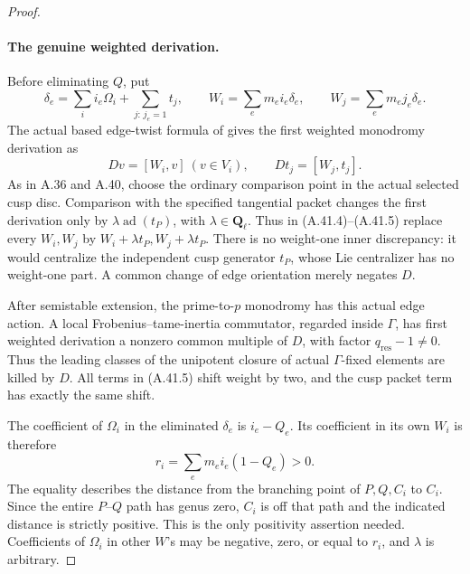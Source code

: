 \begin{proof}
\paragraph{The genuine weighted derivation.}
Before eliminating \(Q\), put
\[
 \delta_e=\sum_i i_e\Omega_i+\sum_{j:\,j_e=1}t_j,
 \qquad W_i=\sum_e m_ei_e\delta_e,
 \qquad W_j=\sum_e m_ej_e\delta_e.                    \tag{A.41.4}
\]
The actual based edge-twist formula of
\cite[Definition 3.1.5 and Theorem 3.1.6]{fghBettsDogra}
gives the first weighted monodromy derivation as
\[
                  Dv=[W_i,v]\ (v\in V_i),
                  \qquad Dt_j=[W_j,t_j].             \tag{A.41.5}
\]
As in A.36 and A.40, choose the ordinary comparison point
in the actual selected cusp disc. Comparison with the
specified tangential packet changes the first derivation
only by \(\lambda\operatorname{ad}(t_P)\), with
\(\lambda\in\mathbf Q_\ell\). Thus in (A.41.4)--(A.41.5)
replace every \(W_i,W_j\) by \(W_i+\lambda t_P,W_j+
\lambda t_P\). There is no weight-one inner discrepancy:
it would centralize the independent cusp generator
\(t_P\), whose Lie centralizer has no weight-one part.
A common change of edge orientation merely negates \(D\).

After semistable extension, the prime-to-\(p\) monodromy
has this actual edge action. A local Frobenius--tame-inertia
commutator, regarded inside \(\Gamma\), has first
weighted derivation a nonzero common multiple of \(D\),
with factor \(q_{\mathrm{res}}-1\ne0\). Thus the
leading classes of the unipotent closure of actual
\(\Gamma\)-fixed elements are killed by \(D\).
All terms in (A.41.5) shift weight by two, and the cusp
packet term has exactly the same shift.

The coefficient of \(\Omega_i\) in the eliminated
\(\delta_e\) is \(i_e-Q_e\). Its coefficient in
its own \(W_i\) is therefore
\[
               r_i=\sum_e m_ei_e(1-Q_e)>0.           \tag{A.41.6}
\]
The equality describes the distance from the branching
point of \(P,Q,C_i\) to \(C_i\). Since the entire
\(P\)--\(Q\) path has genus zero, \(C_i\) is off
that path and the indicated distance is strictly positive.
This is the only positivity assertion needed. Coefficients
of \(\Omega_i\) in other \(W\)'s may be negative,
zero, or equal to \(r_i\), and \(\lambda\) is arbitrary.


\end{proof}

